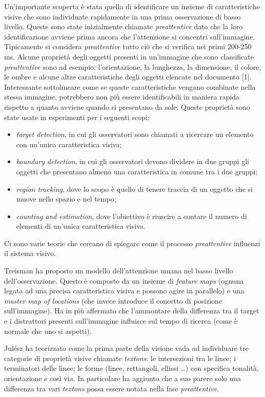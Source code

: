 \documentclass[%
	corpo=12pt,
    twoside,
    stile=classica,
    oldstyle,
    tipotesi=custom,
    greek,
    evenboxes,
]{toptesi}
\begin{document}
{Un'importante scoperta è stata quella di identificare un insieme di caratteristiche visive che sono individuate rapidamente in una prima osservazione di basso livello. Queste sono state inizialmente chiamate \textit{preattentive} dato che la loro identificazione avviene prima ancora che l'attenzione si concentri sull'immagine. Tipicamente si considera \textit{preattentive}  tutto ciò che si verifica nei primi 200-250 ms. Alcune proprietà degli oggetti presenti in un'immagine che sono classificate \textit{preattentive} sono ad esempio: l'orientazione, la lunghezza, la dimensione, il colore, le ombre e alcune altre caratteristiche degli oggetti elencate nel documento [1]. Interessante sottolineare come se queste caratteristiche vengano combinate nella stessa immagine, potrebbero non più essere identificabili in maniera rapida rispetto a quanto avviene quando si presentano da sole. Queste proprietà sono state usate in esperimenti per i seguenti scopi: 
\begin{itemize}
\item \textit{target detection}, in cui gli osservatori sono chiamati a ricercare un elemento con un'unica caratteristica visiva;
\item \textit{boundary detection},  in cui gli osservatori devono dividere in due gruppi gli oggetti che presentano almeno una caratteristica in comune tra i due gruppi;
\item \textit{region tracking}, dove lo scopo è quello di tenere traccia di un oggetto che si muove nello spazio e nel tempo; 
\item \textit{counting and estimation}, dove l'obiettivo è riuscire a contare il numero di elementi di un'unica caratteristica visiva.
\end{itemize}

Ci sono varie teorie che cercano di spiegare come il processo \textit{preattentive} influenzi il sistema visivo.

Treisman ha proposto un modello dell'attenzione umana nel basso livello dell'osservazione. Questo è composto da un insieme di \textit{feature maps} (ognuna legata ad una precisa caratteristica visiva e possono agire in parallelo) e una \textit{master map of locations} (che invece introduce il concetto di posizione sull'immagine). Ha in più affermato che l'ammontare della differenza tra il target e i distrattori presenti sull'immagine influisce sul tempo di ricerca (come è normale che uno si aspetti).

Julész ha teorizzato come la prima parte della visione vada ad individuare tre categorie di proprietà visive chiamate \textit{textons}: le intersezioni tra le linee; i terminatori delle linee; le forme (linee, rettangoli, ellissi \dots) con specifica tonalità, orientazione e così via. In particolare ha aggiunto che a suo parere solo una differenza tra vari \textit{textons} possa essere notata nella fase \textit{preattentive}. 

}
\end{document}
